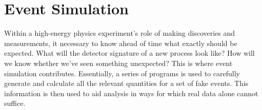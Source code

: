 \chapter{Event Simulation}
\label{sim}









Within %
a high-energy physics experiment's role of making 
discoveries and measurements, 
it necessary to know ahead of time what exactly 
should be expected. 
What will the detector signature of a new process look like? 
How will we know whether we've seen something unexpected? 
This is where event simulation contributes.  
Essentially, a series of programs is used to carefully 
generate and calculate all the relevant quantities for a set of 
fake events.  
This information is then used 
to aid analysis in ways for which 
real data alone cannot suffice.  

